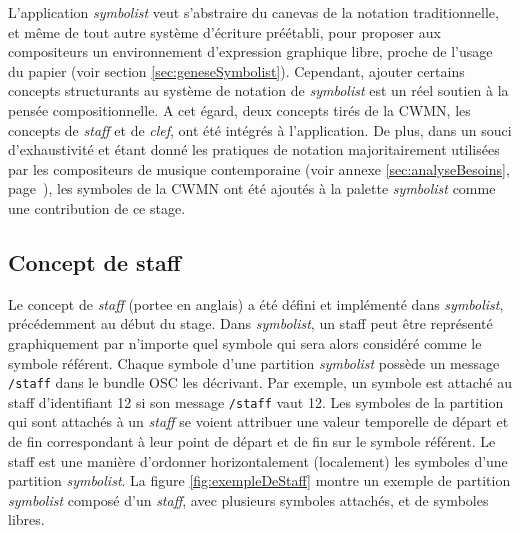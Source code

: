 L'application \textit{symbolist} veut s'abstraire du canevas de la notation traditionnelle, et même de tout autre système d'écriture préétabli, pour proposer aux compositeurs un environnement d'expression graphique libre, proche de l'usage du papier (voir section \ref{sec:geneseSymbolist}).
Cependant, ajouter certains concepts structurants au système de notation de \textit{symbolist} est un réel soutien à la pensée compositionnelle. A cet égard, deux concepts tirés de la CWMN, les concepts de \textit{staff} et de \textit{clef}, ont été intégrés à l'application. 
De plus, dans un souci d'exhaustivité et étant donné les pratiques de notation majoritairement utilisées par les compositeurs de musique contemporaine (voir annexe \ref{sec:analyseBesoins}, page~\pageref{sec:analyseBesoins}), les symboles de la CWMN ont été ajoutés à la palette \textit{symbolist} comme une contribution de ce stage.

\subsection{Concept de staff} 
\label{subsec:conceptDeStaff}
Le concept de \textit{staff} (\gls{portee} en anglais) a été défini et implémenté dans \textit{symbolist}, précédemment au début du stage.
Dans \textit{symbolist}, un staff peut être représenté graphiquement par n'importe quel symbole qui sera alors considéré comme le symbole référent. Chaque symbole d'une partition \textit{symbolist} possède un message \texttt{/staff} dans le bundle OSC les décrivant. Par exemple, un symbole est attaché au staff d'identifiant 12 si son message \texttt{/staff} vaut 12.
Les symboles de la partition qui sont attachés à un \textit{staff} se voient attribuer une valeur temporelle de départ et de fin correspondant à leur point de départ et de fin sur le symbole référent.
Le staff est une manière d'ordonner horizontalement (localement) les symboles d'une partition \textit{symbolist}. 
La figure \ref{fig:exempleDeStaff} montre un exemple de partition \textit{symbolist} composé d'un \textit{staff}, avec plusieurs symboles attachés, et de symboles libres.

